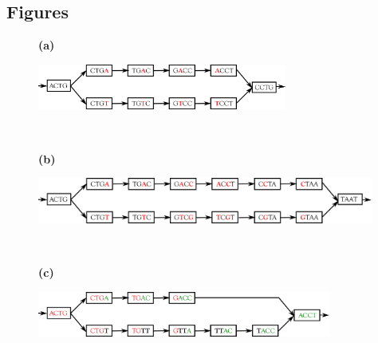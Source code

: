 \documentclass{bmcart}
\begin{document}
\begin{backmatter}



\section*{Figures}

\begin{figure}[h!]  
\begin{minipage}[c]{0.05\textwidth}
\textbf{(a)}
\end{minipage}
\begin{minipage}[c]{0.90\textwidth}
\includegraphics[height=1.5cm]{figures/bubble_snp.png}
\end{minipage}\\

\begin{minipage}[c]{0.05\textwidth}
\textbf{(b)}
\end{minipage}
\begin{minipage}[c]{0.9\textwidth}
\includegraphics[height=1.5cm]{figures/bubble_close_snp.png}
\end{minipage}\\


\begin{minipage}[c]{0.05\textwidth}
\textbf{(c)}
\end{minipage}
\begin{minipage}[c]{0.9\textwidth}
\includegraphics[height=1.5cm]{figures/bubble_indel.png}
\end{minipage}\\


\end{figure}
\end{backmatter}
\end{document}
